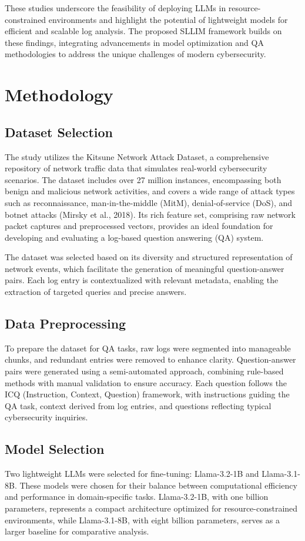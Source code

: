 \documentclass[11pt]{article}
\begin{document}
These studies underscore the feasibility of deploying LLMs in resource-constrained environments and highlight the potential of lightweight models for efficient and scalable log analysis. The proposed SLLIM framework builds on these findings, integrating advancements in model optimization and QA methodologies to address the unique challenges of modern cybersecurity.
\section{Methodology}
\subsection{Dataset Selection}
The study utilizes the Kitsune Network Attack Dataset, a comprehensive repository of network traffic data that simulates real-world cybersecurity scenarios. The dataset includes over 27 million instances, encompassing both benign and malicious network activities, and covers a wide range of attack types such as reconnaissance, man-in-the-middle (MitM), denial-of-service (DoS), and botnet attacks (Mirsky et al., 2018). Its rich feature set, comprising raw network packet captures and preprocessed vectors, provides an ideal foundation for developing and evaluating a log-based question answering (QA) system.

The dataset was selected based on its diversity and structured representation of network events, which facilitate the generation of meaningful question-answer pairs. Each log entry is contextualized with relevant metadata, enabling the extraction of targeted queries and precise answers.

\subsection{Data Preprocessing}
To prepare the dataset for QA tasks, raw logs were segmented into manageable chunks, and redundant entries were removed to enhance clarity. Question-answer pairs were generated using a semi-automated approach, combining rule-based methods with manual validation to ensure accuracy. Each question follows the ICQ (Instruction, Context, Question) framework, with instructions guiding the QA task, context derived from log entries, and questions reflecting typical cybersecurity inquiries.

\subsection{Model Selection}
Two lightweight LLMs were selected for fine-tuning: Llama-3.2-1B and Llama-3.1-8B. These models were chosen for their balance between computational efficiency and performance in domain-specific tasks. Llama-3.2-1B, with one billion parameters, represents a compact architecture optimized for resource-constrained environments, while Llama-3.1-8B, with eight billion parameters, serves as a larger baseline for comparative analysis.
\end{document}
